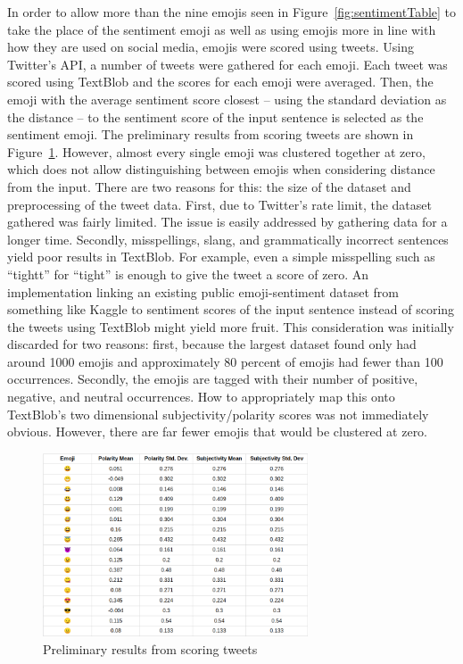 \documentclass{article}[10]
\begin{document}
In order to allow more than the nine emojis seen in
Figure~{\ref{fig:sentimentTable}} to take the place of the
sentiment emoji as well as using emojis more in line with how they are
used on social media, emojis were scored using tweets. Using Twitter's
API, a number of tweets were gathered for each emoji. Each tweet was
scored using TextBlob and the scores for each emoji were averaged. Then,
the emoji with the average sentiment score closest -- using the standard
deviation as the distance -- to the sentiment score of the
input sentence is selected as the sentiment emoji. The preliminary
results from scoring tweets are shown in Figure~\ref{fig:tweetScoring}. However, almost every
single emoji was clustered together at zero, which does not allow distinguishing
between emojis when considering distance from the input. There are two reasons for this: the
size of the dataset and preprocessing of the tweet data. First, due to
Twitter's rate limit, the dataset gathered was fairly limited. The
issue is easily addressed by gathering data for a longer time. Secondly,
misspellings, slang, and grammatically incorrect sentences yield poor
results in TextBlob. For example, even a simple misspelling such as
``tightt'' for ``tight'' is enough to give the tweet a score of
zero. An implementation linking an existing public emoji-sentiment dataset from
something  like Kaggle to sentiment
scores of the input sentence instead of scoring the tweets using TextBlob might
yield more fruit. This consideration was initially discarded for two reasons: first, because the largest dataset found only had around 1000 emojis and approximately 80 percent of emojis had fewer than 100 occurrences. Secondly, the emojis are tagged with their number of positive, negative, and neutral occurrences. How to appropriately map this onto TextBlob's two dimensional subjectivity/polarity scores was not immediately obvious. However, there are far fewer emojis that would be clustered at zero.

\begin{figure}[h]
  \begin{center}
    \includegraphics[width=0.70\textwidth]{figures/sentiment_results1.png}
    \caption{Preliminary results from scoring tweets\label{fig:tweetScoring}}
  \end{center}
\end{figure}
\end{document}
